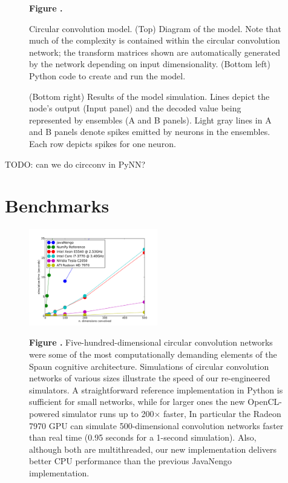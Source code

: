 \documentclass{frontiersSCNS}
\begin{document}
\begin{figure}
\begin{center}
\begin{minipage}{0.43\textwidth}
  \end{minipage}
\end{center}
 \textbf{\label{fig:lorenz} Figure .}{
   Circular convolution model. (Top) Diagram of the model.
   Note that much of the complexity is contained within the
   circular convolution network; the transform matrices shown
   are automatically generated by the network depending on
   input dimensionality.
   (Bottom left) Python code to create and run the model.

   (Bottom right) Results of the model simulation. Lines depict
   the node's output (Input panel) and the decoded value being represented
   by ensembles (A and B panels). Light gray lines in A and B panels denote
   spikes emitted by neurons in the ensembles. Each row depicts spikes
   for one neuron.}
\end{figure}

TODO: can we do circconv in PyNN?

\section{Benchmarks}


\begin{figure}
\begin{center}
  \includegraphics[width=0.5\textwidth]{ocl_vs_ref}
\end{center}
 \textbf{
     \label{fig:ocl_vs_ref}
     Figure .}{
     Five-hundred-dimensional circular convolution networks were some of the most
     computationally demanding elements of the Spaun cognitive architecture.
     Simulations of circular convolution networks of various sizes illustrate the speed of our re-engineered simulators.
     A straightforward reference implementation in Python is sufficient for small networks,
     while for larger ones the new OpenCL-powered simulator runs up to 200$\times$ faster,
     In particular the Radeon 7970 GPU can simulate 500-dimensional convolution networks faster than real time (0.95 seconds for a 1-second simulation).
     Also, although both are multithreaded, our new implementation delivers better CPU performance than the previous JavaNengo implementation.
     }
\end{figure}
\end{document}
